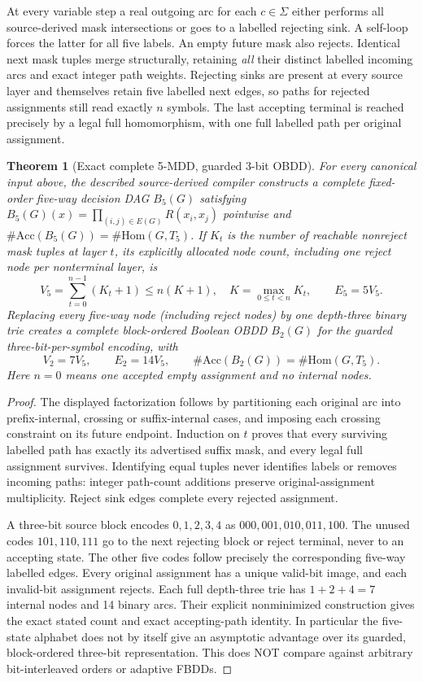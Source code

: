 \documentclass[11pt]{article}
\newtheorem{theorem}{Theorem}
\begin{document}
At every variable step a real outgoing arc for each $c\in\Sigma$
either performs all source-derived mask intersections or goes to
a labelled rejecting sink. A self-loop forces the latter for all five
labels. An empty future mask also rejects. Identical next mask tuples
merge structurally, retaining \emph{all} their distinct labelled incoming
arcs and exact integer path weights. Rejecting sinks are present at
every source layer and themselves retain five labelled next edges,
so paths for rejected assignments still read exactly $n$ symbols.
The last accepting terminal is reached precisely by a legal full
homomorphism, with one full labelled path per original assignment.

\begin{theorem}[Exact complete 5-MDD, guarded 3-bit OBDD]
For every canonical input above, the described source-derived compiler
constructs a complete fixed-order five-way decision DAG $B_5(G)$
satisfying $B_5(G)(x)=\prod_{(i,j)\in E(G)}R(x_i,x_j)$ pointwise and
$\#\mathrm{Acc}(B_5(G))=\#\mathrm{Hom}(G,T_5)$.
If $K_t$ is the number of reachable nonreject mask tuples at layer $t$,
its explicitly allocated node count, including one reject node per
nonterminal layer, is
\[
 V_5=\sum_{t=0}^{n-1}(K_t+1)\le n(K+1),
 \quad K=\max_{0\le t<n}K_t,\qquad E_5=5V_5.
\]
Replacing \emph{every} five-way node (including reject nodes) by one
depth-three binary trie creates a complete block-ordered Boolean OBDD
$B_2(G)$ for the guarded three-bit-per-symbol encoding, with
\[
 V_2=7V_5,\qquad E_2=14V_5,\qquad
 \#\mathrm{Acc}(B_2(G))=\#\mathrm{Hom}(G,T_5).
\]
Here $n=0$ means one accepted empty assignment and no internal nodes.
\end{theorem}
\begin{proof}
The displayed factorization follows by partitioning each original arc
into prefix-internal, crossing or suffix-internal cases, and imposing
each crossing constraint on its future endpoint. Induction on $t$
proves that every surviving labelled path has exactly its advertised
suffix mask, and every legal full assignment survives. Identifying
equal tuples never identifies labels or removes incoming paths:
integer path-count additions preserve original-assignment
multiplicity. Reject sink edges complete every rejected assignment.

A three-bit source block encodes $0,1,2,3,4$ as $000,001,010,011,100$.
The unused codes $101,110,111$ go to the next rejecting block or
reject terminal, never to an accepting state. The other five codes
follow precisely the corresponding five-way labelled edges.
Every original assignment has a unique valid-bit image, and each
invalid-bit assignment rejects. Each full depth-three trie has
$1+2+4=7$ internal nodes and 14 binary arcs. Their explicit
nonminimized construction gives the exact stated count and exact
accepting-path identity. In particular the five-state alphabet does
not by itself give an asymptotic advantage over its guarded,
block-ordered three-bit representation. This does NOT compare
against arbitrary bit-interleaved orders or adaptive FBDDs.
\end{proof}
\end{document}

